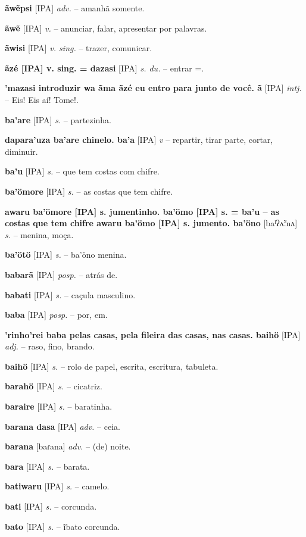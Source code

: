 \textbf{ãwẽpsi} [IPA] \textit{adv.} -- amanhã somente.

\textbf{ãwẽ} [IPA] \textit{v.} -- anunciar, falar, apresentar por palavras.

\textbf{ãwisi} [IPA] \textit{v. sing.} -- trazer, comunicar.

\textbf{ãzé [IPA] v. sing. = dazasi} [IPA] \textit{s. du.} -- entrar  =.

\textbf{'mazasi introduzir  wa ãma ãzé eu entro para junto de você. ã} [IPA] \textit{intj.} -- Eis! Eis aí! Tome!.

\textbf{ba'are} [IPA] \textit{s.} -- partezinha.

\textbf{dapara'uza ba'are chinelo. ba'a} [IPA] \textit{v} -- repartir, tirar parte, cortar, diminuir.

\textbf{ba'u} [IPA] \textit{s.} -- que tem costas com chifre.

\textbf{ba'ömore} [IPA] \textit{s.} -- as costas que tem chifre.

\textbf{awaru ba'ömore [IPA] s. jumentinho. ba'ömo [IPA] s. = ba'u -- as costas que tem chifre  awaru ba'ömo [IPA] s. jumento. ba'öno} [baˡʔʌ̃ːnʌ] \textit{s.} -- menina, moça.

\textbf{ba'ötö} [IPA] \textit{s.} -- ba'öno menina.

\textbf{babarã} [IPA] \textit{posp.} -- atrás de.

\textbf{babati} [IPA] \textit{s.} -- caçula masculino.

\textbf{baba} [IPA] \textit{posp.} -- por, em.

\textbf{'rinho'rei baba pelas casas, pela fileira das casas, nas casas. baihö} [IPA] \textit{adj.} -- raso, fino, brando.

\textbf{baihö} [IPA] \textit{s.} -- rolo de papel, escrita, escritura, tabuleta.

\textbf{barahö} [IPA] \textit{s.} -- cicatriz.

\textbf{baraire} [IPA] \textit{s.} -- baratinha.

\textbf{barana dasa} [IPA] \textit{adv.} -- ceia.

\textbf{barana} [baɾana] \textit{adv.} -- (de) noite.

\textbf{bara} [IPA] \textit{s.} -- barata.

\textbf{batiwaru} [IPA] \textit{s.} -- camelo.

\textbf{bati} [IPA] \textit{s.} -- corcunda.

\textbf{bato} [IPA] \textit{s.} -- ĩbato corcunda.

